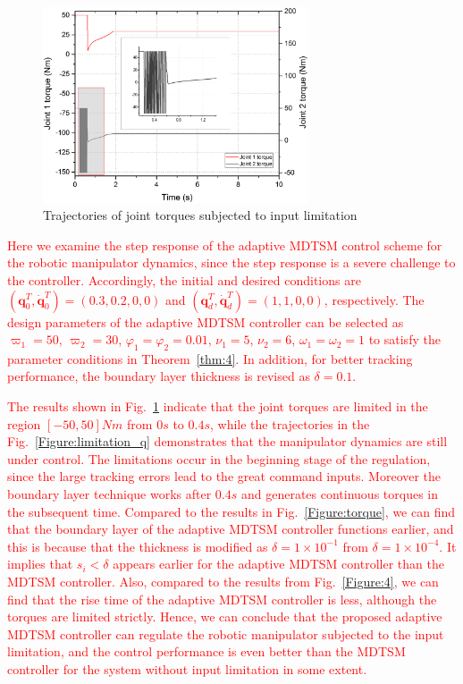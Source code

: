 \documentclass[3p]{elsarticle}
\theoremstyle{plain}
\theoremstyle{remark}
\begin{document}
\begin{figure}
\centering
\includegraphics[width=0.7\textwidth]{paper3_fig_limitation_torque.eps}
\caption{Trajectories of joint torques subjected to  input limitation}
\label{Figure:limitation_torque}
\end{figure}
\textcolor{red}{Here we examine the step response of the adaptive MDTSM control scheme for the robotic manipulator dynamics, since the step response is a severe challenge to the controller. Accordingly, the initial and desired conditions are $(\bm q_0^T, \dot{\bm q}_0^T)= (0.3,0.2,0,0)$ and $({\bm q}_d^T,\dot{\bm q}_d^T)=(1,1,0,0)$, respectively. The design parameters of the adaptive MDTSM controller can be selected as $\varpi_1=50$, $\varpi_2=30$, $\varphi_1=\varphi_2=0.01$, $\nu_1 = 5$, $\nu_2=6$, $\omega_1=\omega_2=1$ to satisfy the parameter conditions in Theorem~\ref{thm:4}. In addition, for better tracking performance, the boundary layer thickness is revised as $\delta=0.1$. }

\textcolor{red}{The results shown in Fig.~\ref{Figure:limitation_torque} indicate that the joint torques are limited in the region $[-50,50]Nm$ from $0s$ to $0.4s$, while the trajectories in the Fig.~\ref{Figure:limitation_q} demonstrates that the manipulator dynamics are still under control. The limitations occur in the beginning stage of the regulation, since the large tracking errors lead to the great command inputs. Moreover the boundary layer technique works after $0.4s$ and generates continuous torques in the subsequent time. Compared to the results in Fig.~\ref{Figure:torque}, we can find that the boundary layer of the adaptive MDTSM controller functions earlier, and this is because that the thickness is modified as $\delta=1\times 10^{-1}$ from $\delta=1\times 10^{-4}$. It implies that $s_i<\delta$ appears earlier for the adaptive MDTSM controller than the MDTSM controller. Also, compared to the results from Fig.~\ref{Figure:4}, we can find that the rise time of the adaptive MDTSM controller is less, although the torques are limited strictly. Hence, we can conclude that the proposed adaptive MDTSM controller can regulate the robotic manipulator subjected to the input limitation, and the control performance is even better than the MDTSM controller for the system without input limitation in some extent.}
\end{document}
